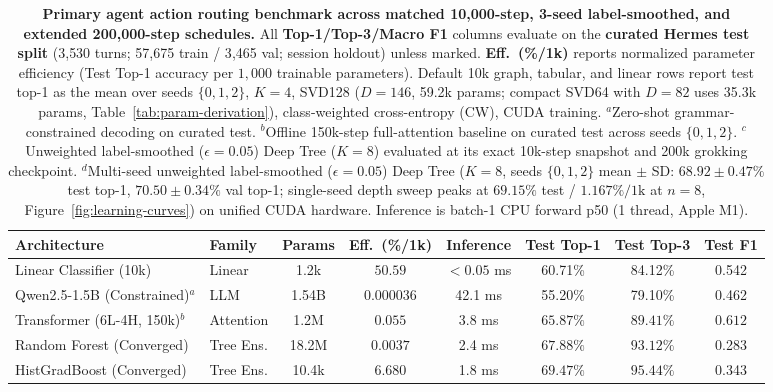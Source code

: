 \documentclass[10pt,twocolumn,letterpaper]{article}
\begin{document}
\begin{table}[tbp]
\centering
\small
\setlength{\tabcolsep}{1.8pt}
\caption{\textbf{Primary agent action routing benchmark across matched 10{,}000-step, 3-seed label-smoothed, and extended 200{,}000-step schedules.} All \textbf{Top-1/Top-3/Macro F1} columns evaluate on the \textbf{curated Hermes test split} (3{,}530 turns; 57{,}675 train / 3{,}465 val; session holdout) unless marked. \textbf{Eff.\ (\%/1k)} reports normalized parameter efficiency (Test Top-1 accuracy per $1{,}000$ trainable parameters). Default 10k graph, tabular, and linear rows report test top-1 as the mean over seeds $\{0,1,2\}$, $K{=}4$, SVD128 ($D{=}146$, 59.2k params; compact SVD64 with $D{=}82$ uses 35.3k params, Table~\ref{tab:param-derivation}), class-weighted cross-entropy (CW), CUDA training. $^a$Zero-shot grammar-constrained decoding on curated test. $^b$Offline 150k-step full-attention baseline on curated test across seeds $\{0,1,2\}$. $^c$Unweighted label-smoothed ($\epsilon{=}0.05$) Deep Tree ($K{=}8$) evaluated at its exact 10k-step snapshot and 200k grokking checkpoint. $^d$Multi-seed unweighted label-smoothed ($\epsilon{=}0.05$) Deep Tree ($K{=}8$, seeds $\{0,1,2\}$ mean $\pm$ SD: $68.92 \pm 0.47\%$ test top-1, $70.50 \pm 0.34\%$ val top-1; single-seed depth sweep peaks at $69.15\%$ test / $1.167\%/\text{1k}$ at $n{=}8$, Figure~\ref{fig:learning-curves}) on unified CUDA hardware. Inference is batch-1 CPU forward p50 (1 thread, Apple M1).}
\label{tab:primary}
\vspace{6pt}
\begin{tabular*}{\textwidth}{@{\extracolsep{\fill}}llcccccc@{}}
\toprule
\textbf{Architecture} & \textbf{Family} & \textbf{Params} & \textbf{Eff.\ (\%/1k)} & \textbf{Inference} & \textbf{Test Top-1} & \textbf{Test Top-3} & \textbf{Test F1} \\
\midrule
Linear Classifier (10k) & Linear & 1.2k & $50.59$ & $<0.05$ ms & 60.71\% & 84.12\% & 0.542 \\
Qwen2.5-1.5B (Constrained)$^a$ & LLM & 1.54B & $0.000036$ & 42.1 ms & 55.20\% & 79.10\% & 0.462 \\
Transformer (6L-4H, 150k)$^b$ & Attention & 1.2M & $0.055$ & 3.8 ms & $65.87\%$ & $89.41\%$ & $0.612$ \\
Random Forest (Converged) & Tree Ens. & 18.2M & $0.0037$ & 2.4 ms & $67.88\%$ & $93.12\%$ & 0.283 \\
HistGradBoost (Converged) & Tree Ens. & 10.4k & $6.680$ & 1.8 ms & $\mathbf{69.47\%}$ & $\mathbf{95.44\%}$ & 0.343 \\

\end{tabular*}
\end{table}
\end{document}
